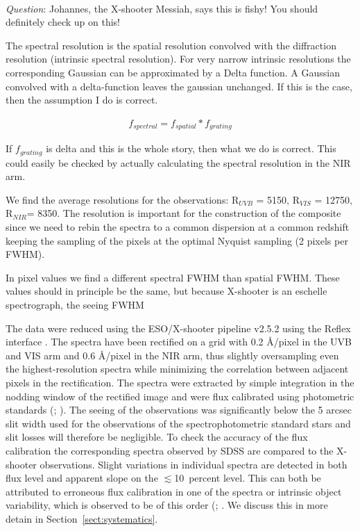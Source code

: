 \documentclass{aa}    %
\newcommand{\sectionname}{Section}
\newcommand{\Sect}[1]{\sectionname~\ref{sect:#1}}
\newcommand{\sect}[1]{\Sect{#1}}
\newcommand{\todo}[3]{{\color{#2}\emph{#1}: #3}}
\newcommand{\qtodo}[1]{\todo{\\ Question}{red}{#1}}
\begin{document}
\qtodo{Johannes, the X-shooter Messiah, says this is fishy! You should definitely check up on this!}

The spectral resolution is the spatial resolution convolved with the diffraction resolution (intrinsic spectral resolution). For very narrow intrinsic resolutions the corresponding Gaussian can be approximated by a Delta function. A Gaussian convolved with a delta-function leaves the gaussian unchanged. If this is the case, then the assumption I do is correct. 

\begin{eqnarray}
f_{spectral} = f_{spatial} \ast f_{grating}
\end{eqnarray}

If $f_{grating}$ is delta and this is the whole story, then what we do is correct. This could easily be checked by actually calculating the spectral resolution in the NIR arm.  


We find the average resolutions for the observations: R$_{UVB}$ = 5150, R$_{VIS}$ = 12750, R$_{NIR}$= 8350. The resolution is important for the construction of the composite since we need to rebin the spectra to a common dispersion at a common redshift keeping the sampling of the pixels at the optimal Nyquist sampling (2 pixels per FWHM). 

In pixel values we find a different spectral FWHM than spatial FWHM. These values should in principle be the same, but because X-shooter is an eschelle spectrograph, the seeing FWHM

The data were reduced using the ESO/X-shooter pipeline v2.5.2 \cite{Modigliani2010}using the Reflex interface \citep{Freudling2013}. The spectra have been rectified on a grid with 0.2 \AA/pixel in the UVB and VIS arm and 0.6 \AA/pixel in the NIR arm, thus slightly oversampling even the highest-resolution spectra while minimizing the correlation between adjacent pixels in the rectification. The spectra were extracted by simple integration in the nodding window of the rectified image and were flux calibrated using photometric standards (\cite{Vernet2010}; \cite{Hamuy1994}). The seeing of the observations was significantly below the 5 arcsec slit width used for the observations of the spectrophotometric standard stars and slit losses will therefore be negligible. To check the accuracy of the flux calibration the corresponding spectra observed by SDSS \citep{Ahn2014} are compared to the X-shooter observations. Slight variations in individual spectra are detected in both flux level and apparent slope on the $\lesssim$10~percent level. This can both be attributed to erroneous flux calibration in one of the spectra or intrinsic object variability, which is observed to be of this order (\cite{MacLeod2012}; \cite{Morganson2014}. We discuss this in more detain in \sect{systematics}.
\end{document}
